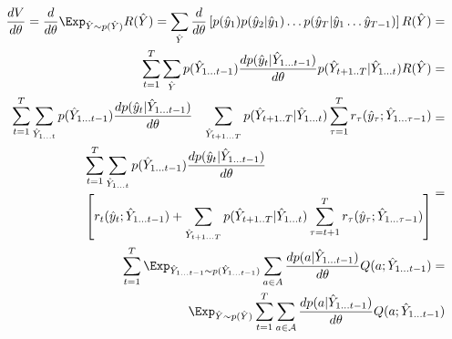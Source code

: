 \begin{align*}
    \frac{dV}{d\theta} = 
    \frac{d}{d\theta} \Exp_{\hat{Y} \sim p(\hat{Y})} R(\hat{Y}) =
    \sum\limits_{\hat{Y}}
    \frac{d}{d\theta}
    \left[
    p(\hat{y}_1) p(\hat{y}_2|\hat{y}_1) 
    \ldots
    p(\hat{y}_T|\hat{y}_1 \ldots \hat{y}_{T-1})
    \right]
    R(\hat{Y}) = \notag\\
    \sum\limits_{t=1}^T
    \sum\limits_{\hat{Y}}
    p(\hat{Y}_{1 \ldots t-1})
    \frac{dp(\hat{y}_t|\hat{Y}_{1 \ldots t - 1})}{d\theta}
    p(\hat{Y}_{t+1 .. T}|\hat{Y}_{1 \ldots t})
    R(\hat{Y}) = \notag\\
    \begin{aligned}
        & \sum\limits_{t=1}^T
          \sum\limits_{\hat{Y}_{1 \ldots t}}
          p(\hat{Y}_{1 \ldots t-1})
          \frac{dp(\hat{y}_t|\hat{Y}_{1 \ldots t - 1})}{d\theta}
        &  \sum\limits_{\hat{Y}_{t + 1 \ldots T}}
           p(\hat{Y}_{t+1 .. T}|\hat{Y}_{1 \ldots t})
           \sum\limits_{\tau=1}^T 
           r_{\tau}(\hat{y}_{\tau}; \hat{Y}_{1 \ldots \tau - 1})
    \end{aligned} 
    =\notag\\
    \begin{aligned}
        & \sum\limits_{t=1}^T
          \sum\limits_{\hat{Y}_{1 \ldots t}}
          p(\hat{Y}_{1 \ldots t-1})
          \frac{dp(\hat{y}_t|\hat{Y}_{1 \ldots t - 1})}{d\theta} \\
        &  \left[
          r_t(\hat{y}_t; \hat{Y}_{1 \ldots t - 1}) +
          \sum\limits_{\hat{Y}_{t + 1 \ldots T}}
           p(\hat{Y}_{t+1 .. T}|\hat{Y}_{1 \ldots t})
           \sum\limits_{\tau=t+1}^T 
           r_{\tau}(\hat{y}_{\tau}; \hat{Y}_{1 \ldots \tau - 1})
           \right]
    \end{aligned} 
    = \notag\\
    \sum\limits_{t=1}^T
    \Exp_{\hat{Y}_{1 \ldots t - 1} \sim p(\hat{Y}_{1 \ldots t - 1})}
    \sum\limits_{a \in A}
    \frac{dp(a|\hat{Y}_{1 \ldots t - 1})}{d\theta}
    Q(a;\hat{Y}_{1 \ldots t - 1}) 
    = \notag\\
    \Exp_{\hat{Y} \sim p(\hat{Y})} 
    \sum\limits_{t=1}^T
    \sum\limits_{a \in \mathcal{A}}
    \frac{dp(a|\hat{Y}_{1 \ldots t - 1})}{d\theta}
    Q(a;\hat{Y}_{1 \ldots t - 1})
\end{align*}    

